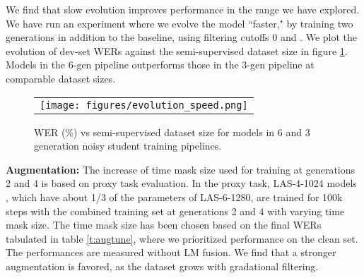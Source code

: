 \documentclass[a4paper]{article}
\begin{document}
We find that slow evolution improves performance in the range we have explored. We have run an experiment where we evolve the model ``faster," by training two generations in addition to the baseline, using filtering cutoffs 0 and . We plot the evolution of dev-set WERs against the semi-supervised dataset size in figure \ref{f:evolutionspeed}. Models in the 6-gen pipeline outperforms those in the 3-gen pipeline at comparable dataset sizes.

\begin{figure}[h]
  \centering
  \vskip -0.05in
  \begin{tabular}{c}
  \texttt{[image: figures/evolution\_speed.png]}
  \end{tabular}
  \vskip -0.05in
  \caption{WER (\%) vs semi-supervised dataset size for models in 6 and 3 generation noisy student training pipelines.}
  \label{f:evolutionspeed}
  \vskip -0.1in
\end{figure}

\noindent\textbf{Augmentation:} The increase of time mask size used for training at generations 2 and 4 is based on proxy task evaluation. In the proxy task, LAS-4-1024 models \cite{specaugment,lasbaseline}, which have about 1/3 of the parameters of LAS-6-1280, are trained for 100k steps with the combined training set at generations 2 and 4 with varying time mask size. The time mask size has been chosen based on the final WERs tabulated in table \ref{t:augtune}, where we prioritized performance on the clean set. The performances are measured without LM fusion. We find that a stronger augmentation is favored, as the dataset grows with gradational filtering.

\begin{table}[h!]
  \vskip -0.05in
  \caption{Proxy task WER (\%) for LibriSpeech 100-860.}
  \label{t:augtune}
  \vskip -0.05in
  \centering
  \small
  \vskip -0.05in
\end{table}
\end{document}
